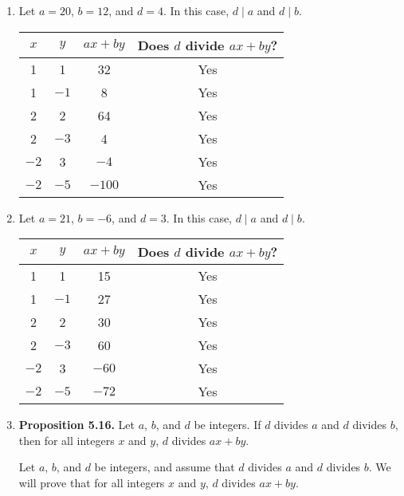 \documentclass[11pt]{article}
\begin{document}
\begin{enumerate}
\item Let  $a = 20$, $b = 12$, and  $d = 4$.  In this case,  $d \mid a$ and $d \mid b$. 
\begin{center}
\begin{tabular}[t]{| c | c | c | c |} \hline
$x$  &  $y$  &  $ax + by$  &	Does  $d$  divide  $ax + by$? \\ \hline
1  &	1  &	32  &	Yes \\ \hline
1  &	$-1$ &	8   &	Yes \\ \hline
2  &	2  &	64  &	Yes \\ \hline
2  &	$-3$ &	4   &	Yes \\ \hline
$-2$ &	3  &	$-4$  &	Yes \\ \hline
$-2$ &	$-5$ &	$-100$ & Yes \\ \hline
\end{tabular}
\end{center}

\item Let  $a = 21$, $b =  - 6$, and  $d = 3$. In this case,  $d \mid a$ and $d \mid b$.
\begin{center}
\begin{tabular}[t]{| c | c | c | c |} \hline
$x$  &  $y$  &  $ax + by$  &	Does  $d$  divide  $ax + by$? \\ \hline
1  &	1  &	15  &	Yes \\ \hline
1  &	$-1$ &	27  &	Yes \\ \hline
2  &	2  &	30  &	Yes \\ \hline
2  &	$-3$ &	60   &	Yes \\ \hline
$-2$ &	3  &	$-60$  &	Yes \\ \hline
$-2$ &	$-5$ &	$-72$ & Yes \\ \hline
\end{tabular}
\end{center}

\item \textbf{Proposition 5.16.}  Let $a$, $b$, and  $d$  be integers.  If  $d$  divides  $a$  and  $d$  divides  $b$, then for all integers  $x$  and  $y$,  $d$  divides  $ax + by$.

\begin{myproof}
Let $a$, $b$, and  $d$  be integers, and assume that $d$  divides  $a$  and  $d$  divides  $b$.  We will prove that for all integers  $x$  and  $y$,  $d$  divides  $ax + by$.


\end{myproof}
\end{enumerate}
\end{document}
